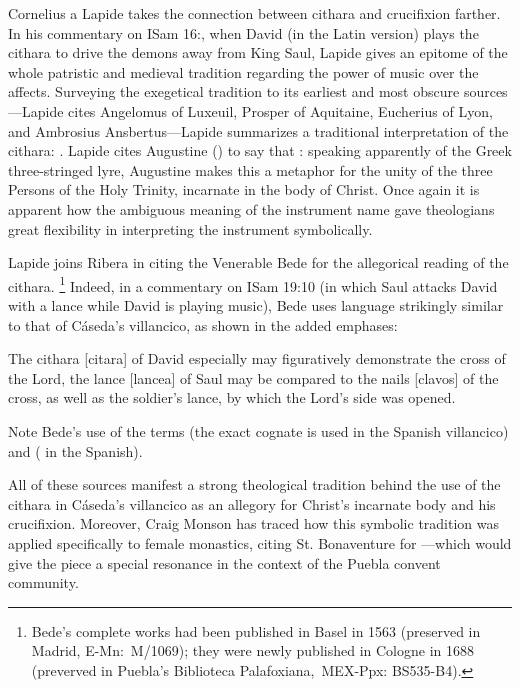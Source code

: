 Cornelius a Lapide takes the connection between cithara and crucifixion farther.
In his commentary on ISam 16:, when David (in the Latin version) plays the cithara to drive the demons away from King Saul, Lapide gives an epitome of the whole patristic and medieval tradition regarding the power of music over the affects.
Surveying the exegetical tradition to its earliest and most obscure sources---Lapide cites Angelomus of Luxeuil, Prosper of Aquitaine, Eucherius of Lyon, and Ambrosius Ansbertus---Lapide summarizes a traditional interpretation of the cithara:
.%
	\Autocite[370]{Lapide:1Samuel}
Lapide cites Augustine () to say that : speaking apparently of the Greek three-stringed lyre, Augustine makes this a metaphor for the unity of the three Persons of the Holy Trinity, incarnate in the body of Christ.%
	\Autocite[370]{Lapide:1Samuel}
Once again it is apparent how the ambiguous meaning of the instrument name gave theologians great flexibility in interpreting the instrument symbolically.

Lapide joins Ribera in citing the Venerable Bede for the allegorical reading of the cithara.%
	\footnote{%
Bede's complete works had been published in Basel in 1563 (preserved in Madrid, E-Mn:~M/1069); they were newly published in Cologne in 1688 (preverved in Puebla's Biblioteca Palafoxiana,~MEX-Ppx: BS535-B4).
	}
Indeed, in a commentary on ISam 19:10 (in which Saul attacks David with a lance while David is playing music), Bede uses language strikingly similar to that of Cáseda's villancico, as shown in the added emphases:

\begin{quoting}
The cithara [citara] of David especially may figuratively demonstrate the cross of the Lord, the lance [lancea] of Saul may be compared to the nails [clavos] of the cross, as well as the soldier's lance, by which the Lord's side was opened.%
	\autocite[123]{Bede:Commentaries2}
\end{quoting}
%
Note Bede's use of the terms  (the exact cognate is used in the Spanish villancico) and  ( in the Spanish).

All of these sources manifest a strong theological tradition behind the use of the cithara in Cáseda's villancico as an allegory for Christ's incarnate body and his crucifixion.
Moreover, Craig Monson has traced how this symbolic tradition was applied specifically to female monastics, citing St. Bonaventure for ---which would give the piece a special resonance in the context of the Puebla convent community.%
	\autocite[93--94]{Monson:DivasConvent}

